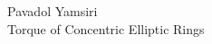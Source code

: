 \documentclass[11pt]{article}
\begin{document}
\vspace{-2cm}
\begin{center}
    \vspace{-3cm}
    Pavadol Yamsiri \\
    \vspace{2mm}
    \horln{}
    Torque of Concentric Elliptic Rings \\
    \vspace{2mm}
    \horln{}
\end{center}
\vspace{0.5mm}


\newpage

\newpage

\newpage

\end{document}
